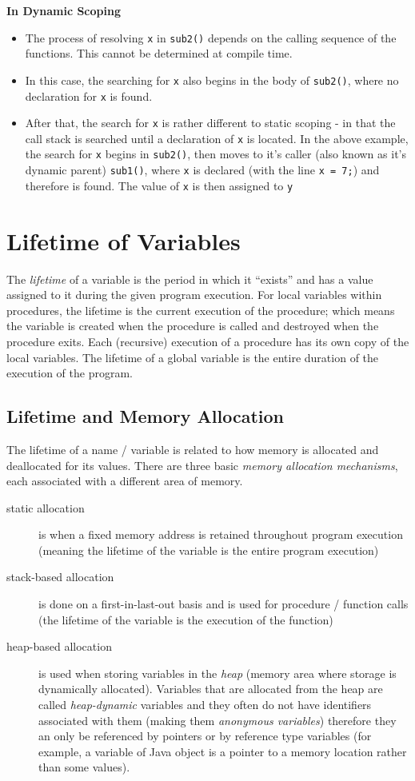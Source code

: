 \textbf{In Dynamic Scoping}
\begin{itemize}
    \item The process of resolving \verb|x| in \verb|sub2()| depends on the calling sequence of the functions. This cannot be determined at compile time.
    \item In this case, the searching for \verb|x| also begins in the body of \verb|sub2()|, where no declaration for \verb|x| is found.
    \item After that, the search for \verb|x| is rather different to static scoping - in that the call stack is searched until a declaration of \verb|x| is located. In the above example, the search for \verb|x| begins in \verb|sub2()|, then moves to it's caller (also known as it's dynamic parent) \verb|sub1()|, where \verb|x| is declared (with the line \verb|x = 7;|) and therefore is found. The value of \verb|x| is then assigned to \verb|y|
\end{itemize}

\section{Lifetime of Variables}
The \textit{lifetime} of a variable is the period in which it ``exists'' and has a value assigned to it during the given program execution. For local variables within procedures, the lifetime is the current execution of the procedure; which means the variable is created when the procedure is called and destroyed when the procedure exits. Each (recursive) execution of a procedure has its own copy of the local variables. The lifetime of a global variable is the entire duration of the execution of the program. 

\subsection{Lifetime and Memory Allocation}
The lifetime of a name / variable is related to how memory is allocated and deallocated for its values. There are three basic \textit{memory allocation mechanisms}, each associated with a different area of memory.
\begin{description}
    \item[static allocation] is when a fixed memory address is retained throughout program execution (meaning the lifetime of the variable is the entire program execution)
    \item[stack-based allocation] is done on a first-in-last-out basis and is used for procedure / function calls (the lifetime of the variable is the execution of the function)
    \item[heap-based allocation] is used when storing variables in the \textit{heap} (memory area where storage is dynamically allocated). Variables that are allocated from the heap are called \textit{heap-dynamic} variables and they often do not have identifiers associated with them (making them \textit{anonymous variables}) therefore they an only be referenced by pointers or by reference type variables (for example, a variable of Java object is a pointer to a memory location rather than some values). 
\end{description}

